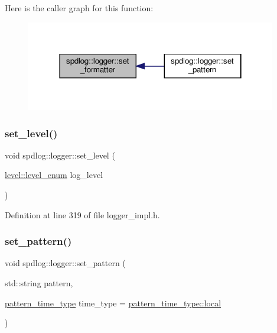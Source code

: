 Here is the caller graph for this function\+:
\nopagebreak
\begin{figure}[H]
\begin{center}
\leavevmode
\includegraphics[width=310pt]{classspdlog_1_1logger_a9c5b880ddf9a9c86ec9893364e57071d_icgraph}
\end{center}
\end{figure}
\mbox{\label{classspdlog_1_1logger_a403ccd4cd1bc85c6ba6b1517c37726c7}} 
\subsubsection{\texorpdfstring{set\+\_\+level()}{set\_level()}}
{\footnotesize\ttfamily void spdlog\+::logger\+::set\+\_\+level (\begin{DoxyParamCaption}\item[{\hyperlink{namespacespdlog_1_1level_a35f5227e5daf228d28a207b7b2aefc8b}{level\+::level\+\_\+enum}}]{log\+\_\+level }\end{DoxyParamCaption})\hspace{0.3cm}{\ttfamily [inline]}}



Definition at line 319 of file logger\+\_\+impl.\+h.

\mbox{\label{classspdlog_1_1logger_a0f61c15b955775652da9b2b813d9f3cd}} 
\subsubsection{\texorpdfstring{set\+\_\+pattern()}{set\_pattern()}}
{\footnotesize\ttfamily void spdlog\+::logger\+::set\+\_\+pattern (\begin{DoxyParamCaption}\item[{std\+::string}]{pattern,  }\item[{\hyperlink{namespacespdlog_ad598fbd8338772e66ae09e8723a07ced}{pattern\+\_\+time\+\_\+type}}]{time\+\_\+type = {\ttfamily \hyperlink{namespacespdlog_ad598fbd8338772e66ae09e8723a07cedaf5ddaf0ca7929578b408c909429f68f2}{pattern\+\_\+time\+\_\+type\+::local}} }\end{DoxyParamCaption})\hspace{0.3cm}{\ttfamily [inline]}}



